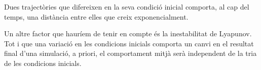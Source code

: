 \begin{thm}
	Dues trajectòries que difereixen en la seva condició inicial comporta, al cap del temps, una distància entre elles que creix exponencialment.
\end{thm}

Un altre factor que hauríem de tenir en compte és la inestabilitat de Lyapunov. Tot i que una variació en les condicions inicials comporta un canvi en el resultat final d'una simulació, a priori, el comportament mitjà serà independent de la tria de les condicions inicials.
